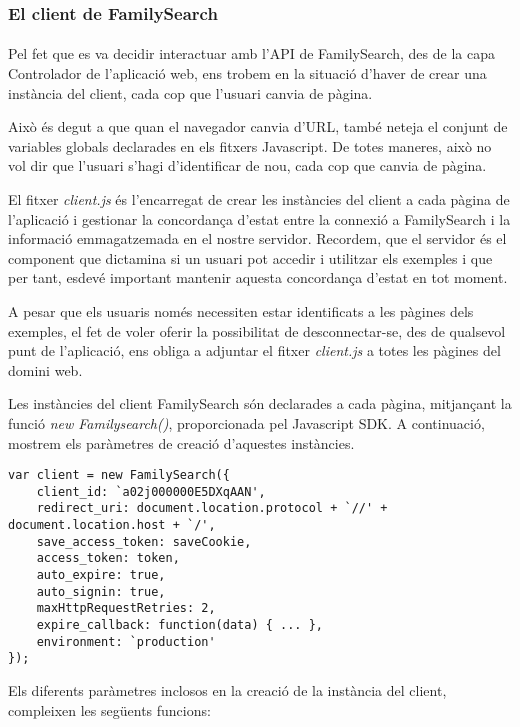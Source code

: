 \subsubsection{El client de FamilySearch}

\paragraph{}
Pel fet que es va decidir interactuar amb l'API de FamilySearch, des de la capa Controlador de l'aplicació web, ens trobem en la situació d'haver de crear una ins\-tàn\-cia del client, cada cop que l'usuari canvia de pàgina.

Això és degut a que quan el navegador canvia d'URL, també neteja el conjunt de variables globals declarades en els fitxers Javascript. De totes maneres, això no vol dir que l'usuari s'hagi d'identificar de nou, cada cop que canvia de pàgina.

El fitxer \emph{client.js} és l'encarregat de crear les instàncies del client a cada pàgina de l'aplicació i gestionar la concordança d'estat entre la connexió a FamilySearch i la informació emmagatzemada en el nostre servidor. Recordem, que el servidor és el component que dictamina si un usuari pot accedir i utilitzar els exemples i que per tant, esdevé important mantenir aquesta concordança d'estat en tot moment.

A pesar que els usuaris només necessiten estar identificats a les pàgines dels exemples, el fet de voler oferir la possibilitat de desconnectar-se, des de qualsevol punt de l'aplicació, ens obliga a adjuntar el fitxer \emph{client.js} a totes les pàgines del domini web.

Les instàncies del client FamilySearch són declarades a cada pàgina, mitjançant la funció \emph{new Familysearch()}, proporcionada pel Javascript SDK. A continuació, mostrem els paràmetres de creació d'aquestes instàncies.

\begin{lstlisting}[style=rawOwn,caption={Creació d'una instància del client FamilySearch}]
var client = new FamilySearch({
    client_id: `a02j000000E5DXqAAN',
    redirect_uri: document.location.protocol + `//' + document.location.host + `/',
    save_access_token: saveCookie,
    access_token: token,
    auto_expire: true,
    auto_signin: true,
    maxHttpRequestRetries: 2,
    expire_callback: function(data) { ... },
    environment: `production'
});
\end{lstlisting}

Els diferents paràmetres inclosos en la creació de la instància del client, compleixen les següents funcions:

